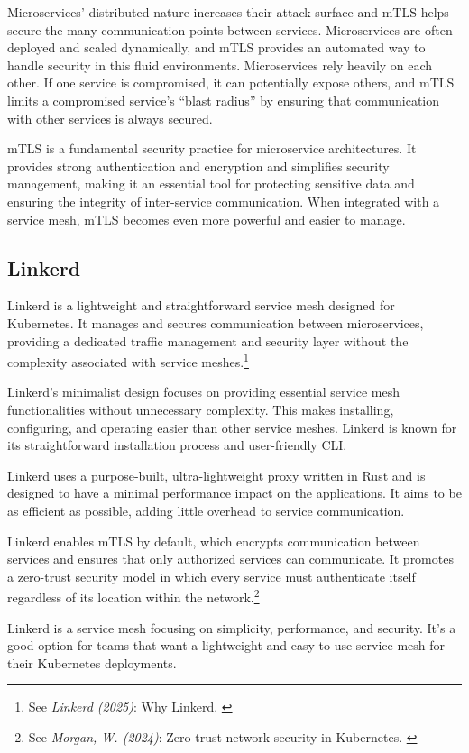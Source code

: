 Microservices' distributed nature increases their attack surface and
mTLS helps secure the many communication points between services.
Microservices are often deployed and scaled dynamically, and mTLS
provides an automated way to handle security in this fluid
environments. Microservices rely heavily on each other. If one service
is compromised, it can potentially expose others, and mTLS limits a
compromised service's ``blast radius'' by ensuring that communication
with other services is always secured.

mTLS is a fundamental security practice for microservice architectures.
It provides strong authentication and encryption and simplifies security
management, making it an essential tool for protecting sensitive data
and ensuring the integrity of inter-service communication. When
integrated with a service mesh, mTLS becomes even more powerful and
easier to manage.

\subsection{Linkerd}

Linkerd is a lightweight and straightforward service mesh designed for
Kubernetes. It manages and secures communication between microservices,
providing a dedicated traffic management and security layer without the
complexity associated with service meshes.\footnote{See \textit{Linkerd (2025)}: Why Linkerd. \cite{linkerD}}

Linkerd's minimalist design focuses on providing essential service
mesh functionalities without unnecessary complexity. This makes
installing, configuring, and operating easier than other service meshes.
Linkerd is known for its straightforward installation process and
user-friendly CLI.

Linkerd uses a purpose-built, ultra-lightweight proxy written in Rust
and is designed to have a minimal performance impact on the
applications. It aims to be as efficient as possible, adding little
overhead to service communication.

Linkerd enables mTLS by default, which encrypts communication between
services and ensures that only authorized services can communicate. It
promotes a zero-trust security model in which every service must
authenticate itself regardless of its location within the network.\footnote{See \textit{Morgan, W. (2024)}: Zero trust network security in Kubernetes. \cite{zeroTrust}}

Linkerd is a service mesh focusing on simplicity, performance, and
security. It's a good option for teams that want a lightweight and
easy-to-use service mesh for their Kubernetes deployments.

